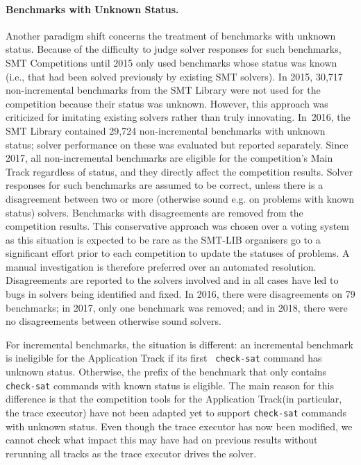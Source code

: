 \documentclass[dvipsnames,table,twoside,11pt]{article}
\newcommand{\maintrack}{Main Track\xspace}
\newcommand{\apptrack}{Application Track\xspace}
\begin{document}
\paragraph{Benchmarks with Unknown Status.}
Another paradigm shift concerns the treatment of benchmarks with
unknown status.  Because of the difficulty to judge solver responses
for such benchmarks, SMT Competitions until 2015 only used benchmarks
whose status was known (i.e., that had been solved previously by
existing SMT solvers).  In 2015, 30,717 non-incremental benchmarks
from the SMT Library were not used for the competition because their
status was unknown.  However, this approach was criticized for
imitating existing solvers rather than truly innovating.  In~2016,
the SMT Library contained 29,724 non-incremental benchmarks with
unknown status; solver performance on these was evaluated but reported
separately.  Since 2017, all non-incremental benchmarks are eligible
for the competition's \maintrack regardless of status, and they
directly affect the competition results.  Solver responses for such
benchmarks are assumed to be correct, unless there is a disagreement
between two or more (otherwise sound e.g. on problems with known status) solvers.  Benchmarks with
disagreements are removed from the competition results.  This conservative approach was chosen over a voting system as this situation is expected to be rare as the SMT-LIB organisers go to a significant effort prior to each competition to update the statuses of problems. A manual investigation is therefore preferred over an automated resolution. Disagreements are reported to the solvers involved and in all cases have led to bugs in solvers being identified and fixed.
In 2016,
there were disagreements on 79 benchmarks; in 2017, only one benchmark
was removed; and in 2018, there were no disagreements between
otherwise sound solvers.

For incremental benchmarks, the situation is different: an incremental
benchmark is ineligible for the \apptrack if its first {\tt
  check-sat} command has unknown status.  Otherwise, the prefix of the
benchmark that only contains {\tt check-sat} commands with known
status is eligible.  The main reason for this difference is that the
competition tools for the \apptrack (in particular, the trace
executor) have not been adapted yet to support {\tt check-sat}
commands with unknown status. Even though the trace executor has now been modified, we cannot check what impact this may have had on previous results without rerunning all tracks as the trace executor drives the solver.
\end{document}
